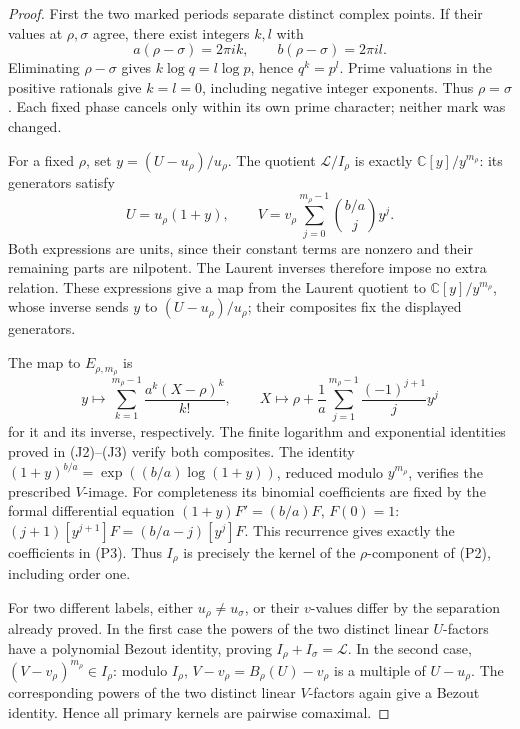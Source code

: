 \begin{proof}
First the two marked periods separate distinct complex points.
If their values at \(\rho,\sigma\) agree, there exist integers
\(k,l\) with
\[
 a(\rho-\sigma)=2\pi i k,\qquad
 b(\rho-\sigma)=2\pi i l.
\]
Eliminating \(\rho-\sigma\) gives \(k\log q=l\log p\), hence
\(q^k=p^l\). Prime valuations in the positive rationals give
\(k=l=0\), including negative integer exponents. Thus
\(\rho=\sigma\). Each fixed phase cancels only within its own
prime character; neither mark was changed.

For a fixed \(\rho\), set \(y=(U-u_\rho)/u_\rho\). The quotient
\(\mathscr L/I_\rho\) is exactly \(\mathbb C[y]/y^{m_\rho}\):
its generators satisfy
\[
 U=u_\rho(1+y),\qquad
 V=v_\rho\sum_{j=0}^{m_\rho-1}\binom{b/a}{j}y^j.
\]
Both expressions are units, since their constant terms are nonzero
and their remaining parts are nilpotent. The Laurent inverses
therefore impose no extra relation. These expressions give a map
from the Laurent quotient to \(\mathbb C[y]/y^{m_\rho}\), whose
inverse sends \(y\) to \((U-u_\rho)/u_\rho\); their composites
fix the displayed generators.

The map to \(E_{\rho,m_\rho}\) is
\[
 y\longmapsto\sum_{k=1}^{m_\rho-1}
              \frac{a^k(X-\rho)^k}{k!},
 \qquad
 X\longmapsto\rho+\frac1a\sum_{j=1}^{m_\rho-1}
                         \frac{(-1)^{j+1}}j y^j
 \tag{P5}
\]
for it and its inverse, respectively. The finite logarithm and
exponential identities proved in (J2)--(J3) verify both composites.
The identity
\((1+y)^{b/a}=\exp((b/a)\log(1+y))\), reduced modulo
\(y^{m_\rho}\), verifies the prescribed \(V\)-image. For
completeness its binomial coefficients are fixed by the formal
differential equation \((1+y)F'=(b/a)F\), \(F(0)=1\):
\((j+1)[y^{j+1}]F=(b/a-j)[y^j]F\). This recurrence gives
exactly the coefficients in (P3). Thus \(I_\rho\) is precisely
the kernel of the \(\rho\)-component of (P2), including order one.

For two different labels, either \(u_\rho\ne u_\sigma\), or their
\(v\)-values differ by the separation already proved. In the
first case the powers of the two distinct linear \(U\)-factors
have a polynomial Bezout identity, proving
\(I_\rho+I_\sigma=\mathscr L\). In the second case,
\((V-v_\rho)^{m_\rho}\in I_\rho\): modulo \(I_\rho\),
\(V-v_\rho=B_\rho(U)-v_\rho\) is a multiple of
\(U-u_\rho\). The corresponding powers of the two distinct
linear \(V\)-factors again give a Bezout identity.
Hence all primary kernels are pairwise comaximal.


\end{proof}
